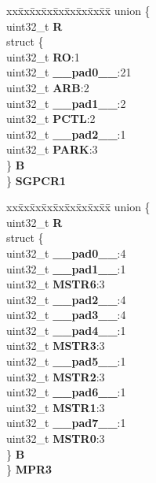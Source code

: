 \begin{DoxyCompactItemize}
\begin{tabbing}
\end{tabbing}\item 
\mbox{\label{structXBAR__tag_aff39d1936dc236e1714c2868e17b3cbb}} 
\begin{tabbing}
xx\=xx\=xx\=xx\=xx\=xx\=xx\=xx\=xx\=\kill
union \{\\
\>uint32\_t {\bfseries R}\\
\>struct \{\\
\>\>uint32\_t {\bfseries RO}:1\\
\>\>uint32\_t {\bfseries \_\_pad0\_\_}:21\\
\>\>uint32\_t {\bfseries ARB}:2\\
\>\>uint32\_t {\bfseries \_\_pad1\_\_}:2\\
\>\>uint32\_t {\bfseries PCTL}:2\\
\>\>uint32\_t {\bfseries \_\_pad2\_\_}:1\\
\>\>uint32\_t {\bfseries PARK}:3\\
\>\} {\bfseries B}\\
\} {\bfseries SGPCR1}\\

\end{tabbing}\item 
\mbox{\label{structXBAR__tag_aa6786a53b8ccf4a1ae38fa21a0d192ee}} 
\begin{tabbing}
xx\=xx\=xx\=xx\=xx\=xx\=xx\=xx\=xx\=\kill
union \{\\
\>uint32\_t {\bfseries R}\\
\>struct \{\\
\>\>uint32\_t {\bfseries \_\_pad0\_\_}:4\\
\>\>uint32\_t {\bfseries \_\_pad1\_\_}:1\\
\>\>uint32\_t {\bfseries MSTR6}:3\\
\>\>uint32\_t {\bfseries \_\_pad2\_\_}:4\\
\>\>uint32\_t {\bfseries \_\_pad3\_\_}:4\\
\>\>uint32\_t {\bfseries \_\_pad4\_\_}:1\\
\>\>uint32\_t {\bfseries MSTR3}:3\\
\>\>uint32\_t {\bfseries \_\_pad5\_\_}:1\\
\>\>uint32\_t {\bfseries MSTR2}:3\\
\>\>uint32\_t {\bfseries \_\_pad6\_\_}:1\\
\>\>uint32\_t {\bfseries MSTR1}:3\\
\>\>uint32\_t {\bfseries \_\_pad7\_\_}:1\\
\>\>uint32\_t {\bfseries MSTR0}:3\\
\>\} {\bfseries B}\\
\} {\bfseries MPR3}\\


\end{tabbing}
\end{DoxyCompactItemize}
